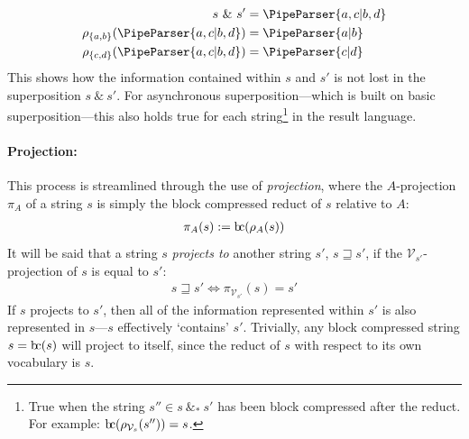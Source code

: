 \documentclass[a4paper,12pt,leqno]{article}
\newcommand{\bc}{{\rm b\!c}}
\newcommand{\vph}[1]{\vphantom{#1}}
\newcommand{\ebox}[1]{\fbox{$\vph{'(),}#1$}}
\renewcommand{\sp}{~\&~}
\newcommand{\spasync}{~\&_*~}
\newcommand{\V}{\mathcal{V}}
\newcommand{\EventString}[1]{%
	\renewcommand*{\do}[1]{\ebox{##1}}%
	\PipeParser{#1}%
}
\begin{document}
\begin{align}\label{ex:disjoint-vocab-reduct}
	s \sp s' &= \EventString{a,c|b,d}\\
	\rho_{\{a,b\}}(\EventString{a,c|b,d}) &= \EventString{a|b}\notag\\
	\rho_{\{c,d\}}(\EventString{a,c|b,d}) &= \EventString{c|d}\notag
\end{align}
This shows how the information contained within $s$ and $s'$ is not lost in the superposition $s \sp s'$. For asynchronous superposition---which is built on basic superposition---this also holds true for each string\footnote{True when the string $s'' \in s \spasync s'$ has been block compressed after the reduct. For example: $\bc(\rho_{\V_s}(s'')) = s$.} in the result language.
\paragraph{Projection:}\label{para:str-op-projection}
This process is streamlined through the use of \textit{projection}, where the $A$-projection $\pi_A$ of a string $s$ is simply the block compressed reduct of $s$ relative to $A$:
\begin{align}
	\pi_A(s) := \bc(\rho_A(s))
\end{align}
It will be said that a string $s$ \textit{projects to} another string $s'$, $s \sqsupseteq s'$, if the $\V_{s'}$-projection of $s$ is equal to $s'$:
\begin{align}
	s \sqsupseteq s' \Longleftrightarrow  \pi_{\V_{s'}}(s) = s'\label{def:projection}
\end{align}
If $s$ projects to $s'$, then all of the information represented within $s'$ is also represented in $s$---$s$ effectively `contains' $s'$. Trivially, any block compressed string $s = \bc(s)$ will project to itself, since the reduct of $s$ with respect to its own vocabulary is $s$.
\end{document}
